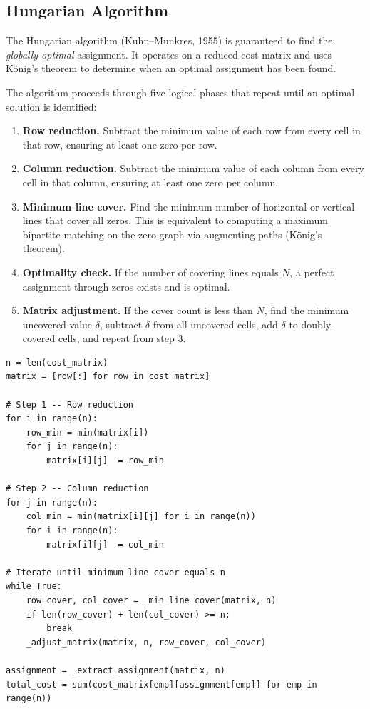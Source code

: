 \documentclass[12pt,a4paper]{article}
\begin{document}
\subsection{Hungarian Algorithm}

The Hungarian algorithm (Kuhn--Munkres, 1955) is guaranteed to find the
\emph{globally optimal} assignment. It operates on a reduced cost matrix and
uses König's theorem to determine when an optimal assignment has been found.

The algorithm proceeds through five logical phases that repeat until an optimal
solution is identified:

\needspace{8cm}
\begin{enumerate}
    \item \textbf{Row reduction.} Subtract the minimum value of each row from every
          cell in that row, ensuring at least one zero per row.
    \item \textbf{Column reduction.} Subtract the minimum value of each column from
          every cell in that column, ensuring at least one zero per column.
    \item \textbf{Minimum line cover.} Find the minimum number of horizontal or
          vertical lines that cover all zeros. This is equivalent to computing a
          maximum bipartite matching on the zero graph via augmenting paths
          (König's theorem).
    \item \textbf{Optimality check.} If the number of covering lines equals $N$,
          a perfect assignment through zeros exists and is optimal.
    \item \textbf{Matrix adjustment.} If the cover count is less than $N$, find the
          minimum uncovered value $\delta$, subtract $\delta$ from all uncovered cells,
          add $\delta$ to doubly-covered cells, and repeat from step 3.
\end{enumerate}

\needspace{12cm}
\begin{lstlisting}[caption={Hungarian main body -- backend/algorithms/hungarian.py}]
n = len(cost_matrix)
matrix = [row[:] for row in cost_matrix]

# Step 1 -- Row reduction
for i in range(n):
    row_min = min(matrix[i])
    for j in range(n):
        matrix[i][j] -= row_min

# Step 2 -- Column reduction
for j in range(n):
    col_min = min(matrix[i][j] for i in range(n))
    for i in range(n):
        matrix[i][j] -= col_min

# Iterate until minimum line cover equals n
while True:
    row_cover, col_cover = _min_line_cover(matrix, n)
    if len(row_cover) + len(col_cover) >= n:
        break
    _adjust_matrix(matrix, n, row_cover, col_cover)

assignment = _extract_assignment(matrix, n)
total_cost = sum(cost_matrix[emp][assignment[emp]] for emp in range(n))
\end{lstlisting}
\end{document}
